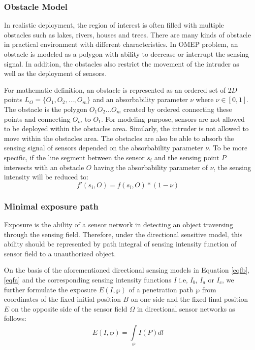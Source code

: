 \documentclass[final]{elsarticle}
\begin{document}
\subsubsection{Obstacle Model}
In realistic deployment, the region of interest is often filled with multiple obstacles such as lakes, rivers, houses and trees. There are many kinds of obstacle in practical environment with different characteristics. In OMEP problem, an obstacle is modeled as a polygon with ability to decrease or interrupt the sensing signal. In addition, the obstacles also restrict the movement of the intruder as well as the deployment of sensors. 

For mathematic definition, an obstacle is represented as an ordered set of $2D$ points $ L_O = \{O_1, O_2,\ldots,O_m\}$ and an absorbability parameter $\nu$ where $\nu \in [0,1]$. The obstacle is the polygon $O_1 O_2\ldots O_m $ created by ordered connecting these points and connecting $O_m$ to $O_1$. For modeling purpose, sensors are not allowed to be deployed within the obstacles area. Similarly, the intruder is not allowed to move within the obstacles area. The obstacles are also be able to absorb the sensing signal of sensors depended on the absorbability parameter $\nu$. To be more specific, if the line segment between the sensor $s_i$ and the sensing point $ P $ intersects with an obstacle $O$ having the absorbability parameter of $\nu$, the sensing intensity will be reduced to: 
\begin{equation}
\label{eqob}
f'(s_i,O) = f(s_i,O) * (1-\nu)
\end{equation}
\subsubsection{Minimal exposure path}
Exposure is the ability of a sensor network in detecting an object traversing through the sensing field. Therefore, under the directional sensitive model, this ability should be represented by path integral of sensing intensity function of sensor field to a unauthorized object. 

On the basis of the aforementioned directional sensing models in Equation \eqref{eqfb}, \eqref{eqfa} and the corresponding sensing intensity functions $I$ i.e, $ I_b $, $ I_a $ or $ I_c $, we further formulate the exposure $ E(I,\wp )$ of a penetration path $ \wp $ from coordinates of the fixed initial position $ B $ on one side and the fixed final position $ E $ on the opposite side of the sensor field $ \Omega $ in directional sensor networks as follows:
 \begin{equation}
 \label{eqE}
E(I,\wp ) = \int\limits_{\wp }^{} {I(P)} dl
 \end{equation}
\end{document}
